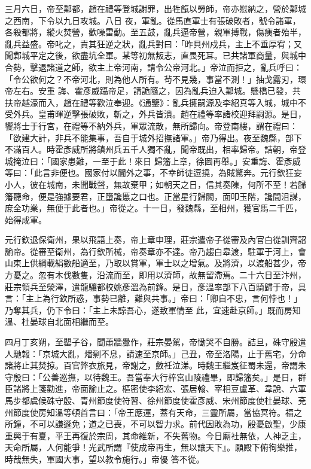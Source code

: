 \begin{pinyinscope}
 三月六日，帝至鄴都，趙在禮等登城謝罪，出牲餼以勞師，帝亦慰納之，營於鄴城之西南，下令以九日攻城。八日
 夜，軍亂。從馬直軍士有張破敗者，號令諸軍，各殺都將，縱火焚營，歡噪雷動。至五鼓，亂兵逼帝營，親軍搏戰，傷痍者殆半，亂兵益盛。帝叱之，責其狂逆之狀，亂兵對曰：「昨貝州戍兵，主上不垂厚宥；又聞鄴城平定之後，欲盡坑全軍。某等初無叛志，直畏死耳。已共諸軍商量，與城中合勢，擊退諸道之師，欲主上帝河南，請令公帝河北。」帝泣而拒之，亂兵呼曰：「令公欲何之？不帝河北，則為他人所有。茍不見幾，事當不測！」抽戈露刃，環帝左右。安重
 誨、霍彥威躡帝足，請詭隨之，因為亂兵迫入鄴城。懸橋已發，共扶帝越濠而入，趙在禮等歡泣奉迎。《通鑒》：亂兵擁嗣源及李紹真等入城，城中不受外兵。皇甫暉逆擊張破敗，斬之，外兵皆潰。趙在禮等率諸校迎拜嗣源。是日，饗將士于行宮，在禮等不納外兵，軍眾流散，無所歸向。帝登南樓，謂在禮曰：「欲建大計，非兵不能集事，吾自于城外招撫諸軍。」帝乃得出。夜至魏縣，部下不滿百人。時霍彥威所將鎮州兵五千人獨不亂，聞帝既出，相率歸帝。詰朝，帝登城掩泣曰：「國家患難，一至于此！來日
 歸籓上章，徐圖再舉。」安重誨、霍彥威等曰：「此言非便也。國家付以閫外之事，不幸師徒逗撓，為賊驚奔。元行欽狂妄小人，彼在城南，未聞戰聲，無故棄甲；如朝天之日，信其奏陳，何所不至！若歸籓聽命，便是強據要君，正墮讒慝之口也。正當星行歸闕，面叩玉階，讒間沮謀，庶全功業，無便于此者也。」帝從之。十一日，發魏縣，至相州，獲官馬二千匹，始得成軍。



 元行欽退保衛州，果以飛語上奏，帝上章申理，莊宗遣帝子從審及內官白從訓齊詔
 諭帝。從審至衛州，為行欽所械，帝奏章亦不達。帝乃趨白皋渡，駐軍于河上，會山東上供綱載絹數船適至，乃取以賞軍，軍士以之增氣。及將濟，以渡船甚少，帝方憂之。忽有木伐數隻，沿流而至，即用以濟師，故無留滯焉。二十六日至汴州，莊宗領兵至滎澤，遣龍驤都校姚彥溫為前鋒。是日，彥溫率部下八百騎歸于帝，具言：「主上為行欽所惑，事勢已離，難與共事。」帝曰：「卿自不忠，言何悖也！」乃奪其兵，仍下令曰：「主上未諒吾心，遂致軍情至
 此，宜速赴京師。」既而房知溫、杜晏球自北面相繼而至。



 四月丁亥朔，至罌子谷，聞蕭牆釁作，莊宗晏駕，帝慟哭不自勝。詰旦，硃守殷遣人馳報：「京城大亂，燔剽不息，請速至京師。」己丑，帝至洛陽，止于舊宅，分命諸將止其焚掠。百官弊衣旅見，帝謝之，斂衽泣涕。時魏王繼岌征蜀未還，帝謂朱守殷曰：「公善巡撫，以待魏王。吾當奉大行梓宮山陵禮畢，即歸籓矣。」是日，群臣諸將上箋勸進，帝面諭止之。樞密使李紹宏、張居翰、宰相豆盧革、韋說、六軍
 馬步都虞候硃守殷、青州節度使符習、徐州節度使霍彥威、宋州節度使杜晏球、兗州節度使房知溫等頓首言曰：「帝王應運，蓋有天命，三靈所屬，當協冥符。福之所鐘，不可以謙遜免；道之已喪，不可以智力求。前代因敗為功，殷憂啟聖，少康重興于有夏，平王再復於宗周，其命維新，不失舊物。今日廟社無依，人神乏主，天命所屬，人何能爭！光武所謂『使成帝再生，無以讓天下』。願殿下俯徇樂推，時哉無失，軍國大事，望以教令施行。」帝優
 答不從。




\end{pinyinscope}
